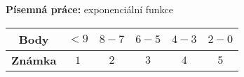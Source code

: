\documentclass[12pt,a4paper,addpoints]{exam}
\begin{document}
    \begin{center}
      \large \textbf{Písemná práce:} exponenciální funkce

      \normalsize
      \qquad
      \qquad
    \end{center}
    \begin{table}[h]
      \centering
      \begin{tabular}{c|c|c|c|c|c}
        \textbf{Body}   & $< 9$ & $8-7$ & $6-5$ & $4-3$ & $2-0$ \\ \hline
        \textbf{Známka} & $1$     & $2$   & $3 $  & $4$   & $5$
      \end{tabular}
    \end{table}
\end{document}
